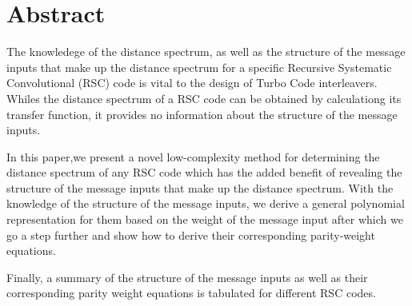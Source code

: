 \section{Abstract}
The knowledege of the distance spectrum, as well as the structure of the message inputs that make up the distance spectrum for a specific Recursive Systematic Convolutional (RSC) code is vital to the design of Turbo Code interleavers. Whiles the distance spectrum of a RSC code can be obtained by calculationg its transfer function, it provides no information about the structure of the message inputs. %

In this paper,we present a novel low-complexity method for determining the distance spectrum of any RSC code which has the added benefit of revealing the structure of the message inputs that make up the distance spectrum.
 With the knowledge of the structure of the message inputs, we derive a general polynomial representation for them based on the weight of the message input after which we go a step further and show how to derive their corresponding parity-weight equations.
 
 Finally, a summary of the structure of the message inputs as well as their corresponding parity weight equations is tabulated for different RSC codes.
